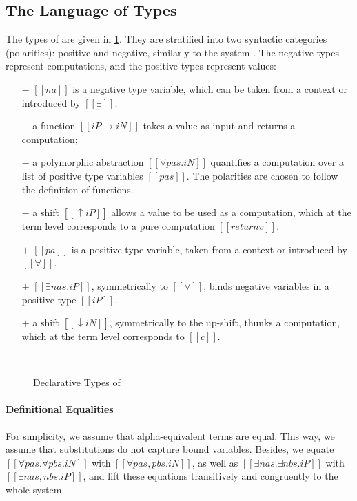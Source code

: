 \subsection{The Language of Types}

The types of \fexists are given in \cref{fig:declarative-types}.
They are stratified into two syntactic 
categories (polarities): positive and negative,  
similarly to the \CBPV system \cite{levy2006:cbpv}.
The negative types represent computations, and the positive types represent values:
\begin{itemize}
\item [$-$] $[[na]]$ is a negative type variable, which can be taken from a context or introduced by $[[∃]]$.
\item [$-$] a function $[[iP → iN]]$ takes a value as input and returns a computation; 
\item [$-$] a polymorphic abstraction $[[∀pas.iN]]$ quantifies a computation over
  a list of positive type variables 
  $[[pas]]$. The polarities are chosen to follow the definition of functions.
\item [$-$] a shift $[[↑iP]]$ allows a value to be used as a computation, 
  which at the term level corresponds to a pure computation $[[return v]]$.
\item [$+$] $[[pa]]$ is a positive type variable, taken from a context or introduced by $[[∀]]$.
\item [$+$] $[[∃nas.iP]]$, symmetrically to $[[∀]]$, 
  binds negative variables in a positive type $[[iP]]$. 
\item [$+$] a shift $[[↓iN]]$, symmetrically to the up-shift, 
  thunks a computation, which at the term level corresponds to $[[ {c} ]]$.
\end{itemize}

\begin{figure}[h]
  \begin{multicols}{2}
    \ottgrammartabular{
      \ottiN\ottinterrule
    }\\
    \ottgrammartabular{
      \ottiP\ottinterrule
    }
    \columnbreak
  \end{multicols}
  \caption{Declarative Types of \fexists}
  \label{fig:declarative-types}
\end{figure}

\paragraph{Definitional Equalities}
For simplicity, we assume that alpha-equivalent terms are equal.
This way, we assume that substitutions do not capture bound variables.
Besides, we equate
$[[∀pas.∀pbs.iN]]$ with $[[∀pas,pbs.iN]]$, 
as well as $[[∃nas.∃nbs.iP]]$ with $[[∃nas,nbs.iP]]$,
and lift these equations transitively and congruently 
to the whole system.

